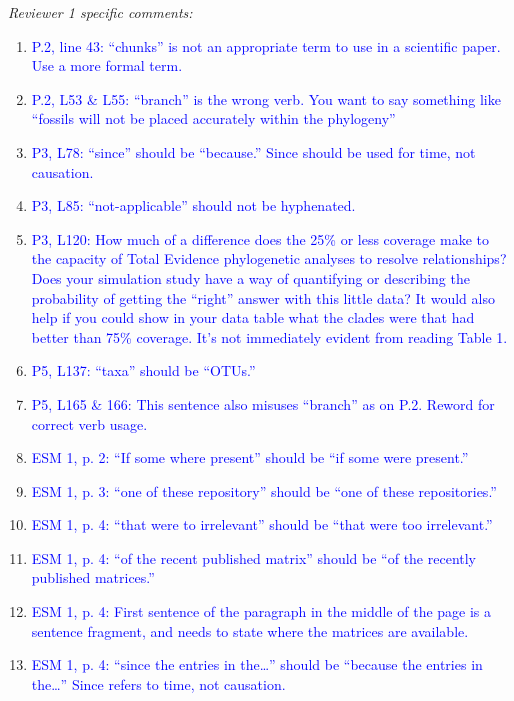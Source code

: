 \documentclass[12pt,letterpaper]{article}
\renewcommand{\subsection}[1]{%
\bigskip
\begin{center}
\begin{large}
\normalfont\itshape #1
\end{large}
\end{center}}
\begin{document}
\subsection{Reviewer 1 specific comments:}
\begin{enumerate}
\item{\textcolor{blue}{P.2, line 43: ``chunks'' is not an appropriate term to use in a scientific paper. Use a more formal term.}}
\item{\textcolor{blue}{P.2, L53 \& L55: ``branch'' is the wrong verb. You want to say something like ``fossils will not be placed accurately within the phylogeny'' }}
\item{\textcolor{blue}{P3, L78: ``since'' should be ``because.'' Since should be used for time, not causation.}}
\item{\textcolor{blue}{P3, L85: ``not-applicable'' should not be hyphenated.}}
\item{\textcolor{blue}{P3, L120: How much of a difference does the 25\% or less coverage make to the capacity of Total Evidence phylogenetic analyses to resolve relationships? Does your simulation study have a way of quantifying or describing the probability of getting the ``right'' answer with this little data? It would also help if you could show in your data table what the clades were that had better than 75\% coverage. It’s not immediately evident from reading Table 1.}}
\item{\textcolor{blue}{P5, L137: ``taxa'' should be ``OTUs.''}}
\item{\textcolor{blue}{P5, L165 \& 166: This sentence also misuses ``branch'' as on P.2. Reword for correct verb usage.}}
\item{\textcolor{blue}{ESM 1, p. 2: ``If some where present'' should be ``if some were present.''}}
\item{\textcolor{blue}{ESM 1, p. 3: ``one of these repository'' should be ``one of these repositories.''}}
\item{\textcolor{blue}{ESM 1, p. 4: ``that were to irrelevant'' should be ``that were too irrelevant.''}}
\item{\textcolor{blue}{ESM 1, p. 4: ``of the recent published matrix'' should be ``of the recently published matrices.''}}
\item{\textcolor{blue}{ESM 1, p. 4: First sentence of the paragraph in the middle of the page is a sentence fragment, and needs to state where the matrices are available.}}
\item{\textcolor{blue}{ESM 1, p. 4: ``since the entries in the…'' should be ``because the entries in the…'' Since refers to time, not causation.}}

\end{enumerate}
\end{document}
